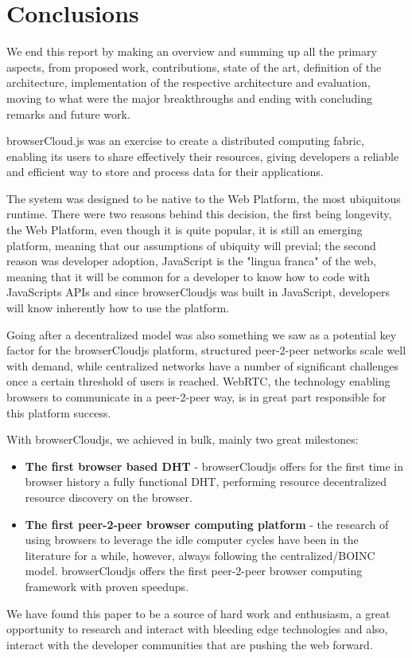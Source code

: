 
\section{Conclusions}

We end this report by making an overview and summing up all the primary aspects, from proposed work, contributions, state of the art, definition of the architecture, implementation of the respective architecture and evaluation, moving to what were the major breakthroughs and ending with concluding remarks and future work.

browserCloud.js was an exercise to create a distributed computing fabric, enabling its users to share effectively their resources, giving developers a reliable and efficient way to store and process data for their applications.

The system was designed to be native to the Web Platform, the most ubiquitous runtime. There were two reasons behind this decision, the first being longevity, the Web Platform, even though it is quite popular, it is still an emerging platform, meaning that our assumptions of ubiquity will previal; the second reason was developer adoption, JavaScript is the "lingua franca" of the web, meaning that it will be common for a developer to know how to code with JavaScripts APIs and since browserCloudjs was built in JavaScript, developers will know inherently how to use the platform.

Going after a decentralized model was also something we saw as a potential key factor for the browserCloudjs platform, structured peer-2-peer networks scale well with demand, while centralized networks have a number of significant challenges once a certain threshold of users is reached. WebRTC, the technology enabling browsers to communicate in a peer-2-peer way, is in great part responsible for this platform success.

With browserCloudjs, we achieved in bulk, mainly two great milestones:

\begin{itemize}
  \item \textbf{The first browser based DHT} - browserCloudjs offers for the first time in browser history a fully functional DHT, performing resource decentralized resource discovery on the browser. 
  \item \textbf{The first peer-2-peer browser computing platform} - the research of using browsers to leverage the idle computer cycles have been in the literature for a while, however, always following the centralized/BOINC model. browserCloudjs offers the first peer-2-peer browser computing framework with proven speedups.
\end{itemize}

We have found this paper to be a source of hard work and enthusiasm, a great opportunity to research and interact with bleeding edge technologies and also, interact with the developer communities that are pushing the web forward.
